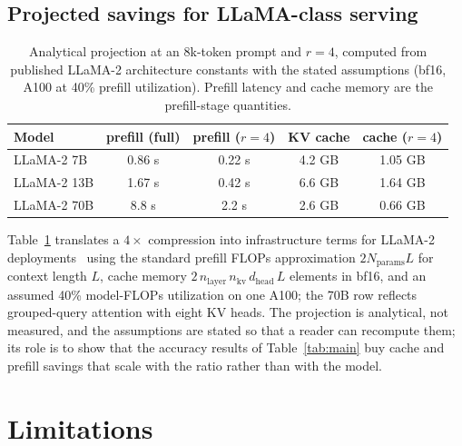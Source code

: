 \documentclass{article}
\begin{document}
\subsection{Projected savings for LLaMA-class serving}
\label{sec:projection}

\begin{table}[t]
\centering
\caption{Analytical projection at an 8k-token prompt and $r=4$,
computed from published LLaMA-2 architecture constants with the stated
assumptions (bf16, A100 at 40\% prefill utilization). Prefill latency
and cache memory are the prefill-stage quantities.}
\label{tab:projection}
\small
\begin{tabular}{lcccc}
\toprule
Model & prefill (full) & prefill ($r=4$) & KV cache & cache ($r=4$) \\
\midrule
LLaMA-2 7B & 0.86 s & 0.22 s & 4.2 GB & 1.05 GB \\
LLaMA-2 13B & 1.67 s & 0.42 s & 6.6 GB & 1.64 GB \\
LLaMA-2 70B & 8.8 s & 2.2 s & 2.6 GB & 0.66 GB \\
\bottomrule
\end{tabular}
\end{table}

Table~\ref{tab:projection} translates a $4\times$ compression into
infrastructure terms for LLaMA-2 deployments~\citep{touvron2023llama}
using the standard prefill FLOPs approximation $2N_{\mathrm{params}}L$
for context length $L$, cache memory
$2\,n_{\mathrm{layer}}\,n_{\mathrm{kv}}\,d_{\mathrm{head}}\,L$ elements
in bf16, and an assumed 40\% model-FLOPs utilization on one A100; the
70B row reflects grouped-query attention with eight KV heads. The
projection is analytical, not measured, and the assumptions are stated
so that a reader can recompute them; its role is to show that the
accuracy results of Table~\ref{tab:main} buy cache and prefill savings
that scale with the ratio rather than with the model.

\section{Limitations}
\label{sec:limitations}
\end{document}
